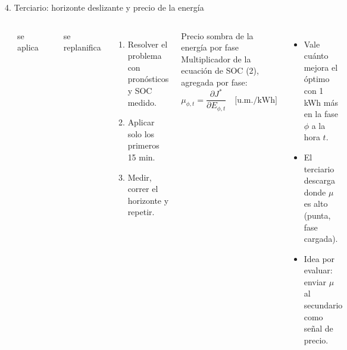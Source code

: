 \documentclass[aspectratio=169,10pt,t]{beamer}
\begin{document}
\begin{frame}{4. Terciario: horizonte deslizante y precio de la energía}
  \begin{columns}[T,onlytextwidth]
    \centering

    \vspace{2pt}
    {\scriptsize \textcolor{usachO}{\rule{6pt}{6pt}} se aplica \quad \textcolor{usachT!40}{\rule{6pt}{6pt}} se replanifica\par}
    \vspace{4pt}
    \footnotesize\raggedright
    \begin{enumerate}\setlength\itemsep{1pt}
      \item Resolver el problema con pronósticos y SOC medido.
      \item Aplicar solo los primeros 15 min.
      \item Medir, correr el horizonte y repetir.
    \end{enumerate}
    \begin{block}{Precio sombra de la energía por fase}
      \footnotesize Multiplicador de la ecuación de SOC (2), agregada por fase:
      \[ \mu_{\phi,t}=\frac{\partial J^*}{\partial E_{\phi,t}}\quad\text{[u.m./kWh]} \]
    \end{block}
    \footnotesize
    \begin{itemize}\setlength\itemsep{3pt}
      \item Vale cuánto mejora el óptimo con 1 kWh más en la fase $\phi$ a la hora $t$.
      \item El terciario descarga donde $\mu$ es alto (punta, fase cargada).
      \item Idea por evaluar: enviar $\mu$ al secundario como señal de precio.
    \end{itemize}
  \end{columns}
\end{frame}
\end{document}
